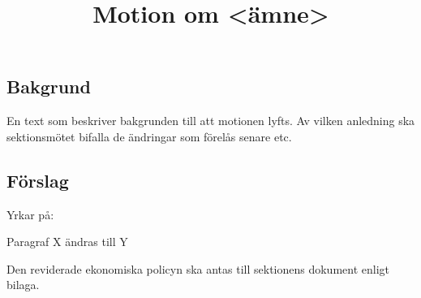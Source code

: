 \documentclass[11pt, noincludeaddress, nopagination]{../../classes/cthit}
\begin{document}
\title{Motion om <ämne>}

\makeheadfoot%

\makesimpletitle

\subsection*{Bakgrund}
En text som beskriver bakgrunden till att motionen lyfts. Av vilken anledning ska sektionsmötet bifalla de ändringar som förelås senare etc.

\subsection*{Förslag}
Yrkar på:
\begin{att}
	\item Paragraf X ändras till Y
	\item Den reviderade ekonomiska policyn ska antas till sektionens dokument enligt bilaga.
\end{att}
\end{document}
